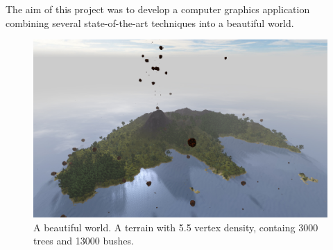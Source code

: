 The aim of this project was to develop a computer graphics application combining several state-of-the-art techniques into a beautiful world. 
\begin{figure}[H]
  \centering
  \includegraphics[width=1.0\linewidth]{images/frontImage.jpg}
  \caption{A beautiful world. A terrain with 5.5 vertex density, containg 3000 trees and 13000 bushes.}
  \label{fig:beautifulIsland}
\end{figure}%